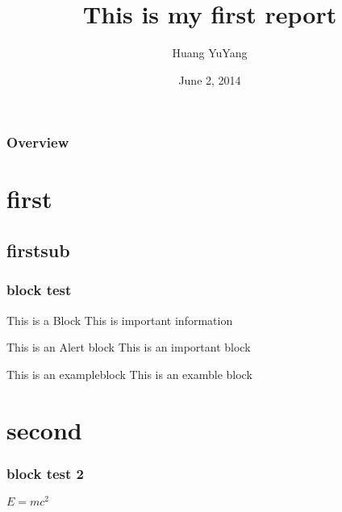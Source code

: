 \documentclass[mathserif,serif]{beamer}
\title[Lab report]{This is my first report} %
\author{Huang YuYang} %
\institute[U Tokyo] %
{
The University of Tokyo \\ %
Institute of Industrial Science \\
Kamijo Lab \\
\medskip
\textit{huangyuyang@kmj.iis.u-tokyo.ac.jp} %
}
\date{June 2, 2014} %
\begin{document}
\begin{frame}
  \titlepage
\end{frame}


\begin{frame}
  \frametitle{Overview}
  \tableofcontents
\end{frame}

\section{first}
\subsection{firstsub}

\begin{frame}
  \frametitle{block test}
  \begin{block}{This is a Block}
    This is important information
  \end{block}
  \begin{alertblock}{This is an Alert block}
    This is an important block
  \end{alertblock}
  \begin{exampleblock}{This is an exampleblock}
    This is an examble block
  \end{exampleblock}
\end{frame}

\section{second}

\begin{frame}
  \frametitle{block test 2}
  \begin{Theorem}
    $E = mc^2 $
  \end{Theorem}
\end{frame}
\end{document}
